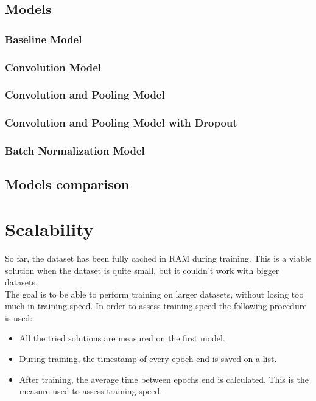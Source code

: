 \documentclass[a4paper,12pt]{article}
\begin{document}
\newcommand{\bat}{Batch Norm.(\texttt{BatchN.})}

\newpage

\subsection{Models}

\subsubsection{Baseline Model}


\subsubsection{Convolution Model}


\subsubsection{Convolution and Pooling Model}


\subsubsection{Convolution and Pooling Model with Dropout}


\subsubsection{Batch Normalization Model}


\subsection{Models comparison}





\newpage
\section{Scalability}
So far, the dataset has been fully cached in RAM during training. This is a viable solution when the dataset is quite small, but it couldn't work with bigger datasets.\\
The goal is to be able to perform training on larger datasets, without losing too much in training speed. In order to assess training speed the following procedure is used:
\begin{itemize}
\item All the tried solutions are measured on the first model.
\item During training, the timestamp of every epoch end is saved on a list.
\item After training, the average time between epochs end is calculated. This is the measure used to assess training speed.
\end{itemize}
\end{document}
